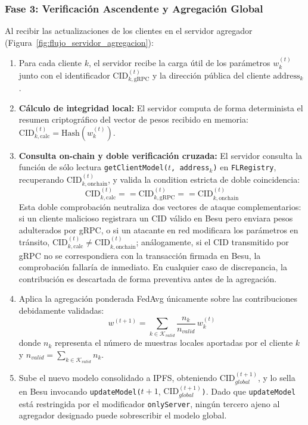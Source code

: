 \subsubsection{Fase 3: Verificación Ascendente y Agregación Global}
Al recibir las actualizaciones de los clientes en el servidor agregador (Figura~\ref{fig:flujo_servidor_agregacion}):
\begin{enumerate}
    \item Para cada cliente $k$, el servidor recibe la carga útil de los parámetros $w_k^{(t)}$ junto con el identificador $\text{CID}_{k,\text{gRPC}}^{(t)}$ y la dirección pública del cliente $\text{address}_k$.
    \item \textbf{Cálculo de integridad local:} El servidor computa de forma determinista el resumen criptográfico del vector de pesos recibido en memoria: $\text{CID}_{k,\text{calc}}^{(t)} = \text{Hash}(w_k^{(t)})$.
    \item \textbf{Consulta on-chain y doble verificación cruzada:} El servidor consulta la función de sólo lectura \texttt{getClientModel($t$, address$_k$)} en \texttt{FLRegistry}, recuperando $\text{CID}_{k,\text{onchain}}^{(t)}$, y valida la condition estricta de doble coincidencia:
    \begin{equation}
    \text{CID}_{k,\text{calc}}^{(t)} == \text{CID}_{k,\text{gRPC}}^{(t)} == \text{CID}_{k,\text{onchain}}^{(t)}
    \end{equation}
    Esta doble comprobación neutraliza dos vectores de ataque complementarios: si un cliente malicioso registrara un CID válido en Besu pero enviara pesos adulterados por gRPC, o si un atacante en red modificara los parámetros en tránsito, $\text{CID}_{k,\text{calc}}^{(t)} \neq \text{CID}_{k,\text{onchain}}^{(t)}$; análogamente, si el CID transmitido por gRPC no se correspondiera con la transacción firmada en Besu, la comprobación fallaría de inmediato. En cualquier caso de discrepancia, la contribución es descartada de forma preventiva antes de la agregación.
    \item Aplica la agregación ponderada FedAvg únicamente sobre las contribuciones debidamente validadas:
    \begin{equation}
    w^{(t+1)} = \sum_{k \in \mathcal{K}_{valid}} \frac{n_k}{n_{valid}} \, w_k^{(t)}
    \end{equation}
    donde $n_k$ representa el número de muestras locales aportadas por el cliente $k$ y $n_{valid} = \sum_{k \in \mathcal{K}_{valid}} n_k$.
    \item Sube el nuevo modelo consolidado a IPFS, obteniendo $\text{CID}_{global}^{(t+1)}$, y lo sella en Besu invocando \texttt{updateModel(}$t+1$, $\text{CID}_{global}^{(t+1)}$\texttt{)}. Dado que \texttt{updateModel} está restringida por el modificador \texttt{onlyServer}, ningún tercero ajeno al agregador designado puede sobrescribir el modelo global.
\end{enumerate}

